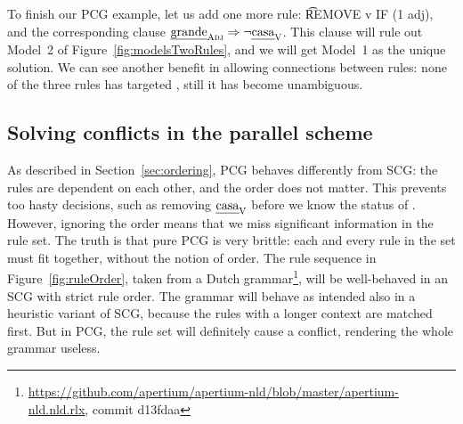 To finish our PCG example, let us add one more rule: \t{REMOVE v IF (1 adj)}, and the corresponding clause $\text{\em grande}_{\text{\sc Adj}} \Rightarrow \neg \text{\em casa}_{\text{\sc V}}$. This clause will rule out Model~2 of Figure~\ref{fig:modelsTwoRules}, and we will get Model~1 as the unique solution. 
We can see another benefit in allowing connections between rules: none of the three rules has targeted \la{}, still it has become unambiguous. 





\subsection{Solving conflicts in the parallel scheme}
\label{sec:parallelScheme}

As described in Section~\ref{sec:ordering}, PCG behaves differently
from SCG: the rules are dependent on each other, and the order does
not matter.  This prevents too hasty decisions, such as removing
$\text{\em casa}_{\text{\sc V}}$ before we know the status of \la{}.  However, ignoring the
order means that we miss significant information in the rule set.  The
truth is that pure PCG is very brittle: each and every rule in the set
must fit together, without the notion of order. The rule sequence in
Figure~\ref{fig:ruleOrder}, taken from a Dutch
grammar\footnote{\url{https://github.com/apertium/apertium-nld/blob/master/apertium-nld.nld.rlx}, commit d13fdaa}, 
will be well-behaved in an SCG with strict rule order.  The grammar
will behave as intended also in a heuristic variant of SCG, because
the rules with a longer context are matched first.  But in PCG, the
rule set will definitely cause a conflict, rendering the whole grammar
useless.



